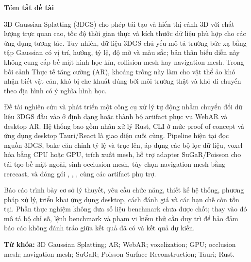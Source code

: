 \begin{center}
{\Large\bfseries Tóm tắt đề tài}
\end{center}

3D Gaussian Splatting (3DGS) cho phép tái tạo và hiển thị cảnh 3D với chất lượng trực quan cao, tốc độ thời gian thực và kích thước dữ liệu phù hợp cho các ứng dụng tương tác. Tuy nhiên, dữ liệu 3DGS chủ yếu mô tả trường bức xạ bằng tập Gaussian có vị trí, hướng, tỷ lệ, độ mờ và màu sắc; bản thân biểu diễn này không cung cấp bề mặt hình học kín, collision mesh hay navigation mesh. Trong bối cảnh Thực tế tăng cường (AR), khoảng trống này làm cho vật thể ảo khó nhận biết vật cản, khó bị che khuất đúng bởi môi trường thật và khó di chuyển theo địa hình có ý nghĩa hình học.

Đề tài nghiên cứu và phát triển một công cụ xử lý tự động nhằm chuyển đổi dữ liệu 3DGS đầu vào ở định dạng  hoặc  thành bộ artifact phục vụ WebAR và desktop AR. Hệ thống bao gồm nhân xử lý Rust, CLI ở mức proof of concept và ứng dụng desktop Tauri/React là giao diện cuối cùng. Pipeline hiện tại đọc nguồn 3DGS, bake căn chỉnh tỷ lệ và trục lên, áp dụng các bộ lọc dữ liệu, voxel hóa bằng CPU hoặc GPU, trích xuất mesh, hỗ trợ adapter SuGaR/Poisson cho tái tạo bề mặt ngoài, sinh occlusion mesh, tùy chọn navigation mesh bằng rerecast, và đóng gói , , ,  cùng các artifact phụ trợ.

Báo cáo trình bày cơ sở lý thuyết, yêu cầu chức năng, thiết kế hệ thống, phương pháp xử lý, triển khai ứng dụng desktop, cách đánh giá và các hạn chế còn tồn tại. Phần thực nghiệm không đưa số liệu benchmark chưa được chốt; thay vào đó mô tả bộ chỉ số, lệnh benchmark và phạm vi kiểm thử cần duy trì để bảo đảm báo cáo không đánh tráo giữa kết quả đã có và kết quả dự kiến.

\vspace{0.4cm}
\noindent\textbf{Từ khóa:} 3D Gaussian Splatting; AR; WebAR; voxelization; GPU; occlusion mesh; navigation mesh; SuGaR; Poisson Surface Reconstruction; Tauri; Rust.

\newpage
